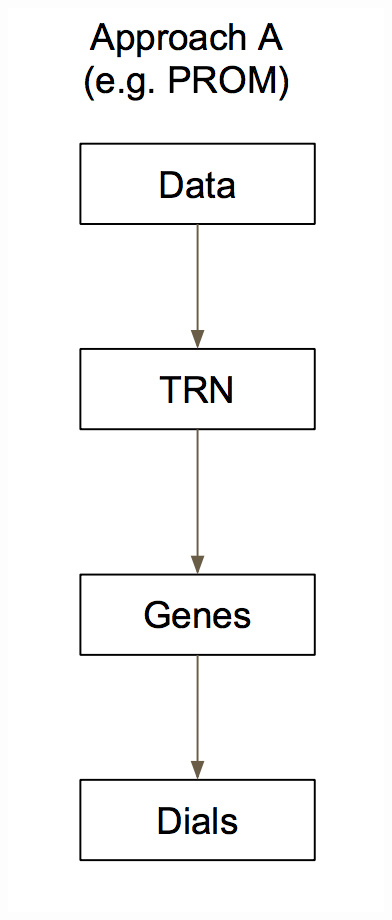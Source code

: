 \documentclass[12pt,chapterheads]{ucsd}
\begin{document}
\begin{figure}[!tbp]
  \centering
  \begin{minipage}[b]{0.4\textwidth}
    \includegraphics[width=\textwidth]{PROM}

\end{minipage}
\end{figure}
\end{document}
